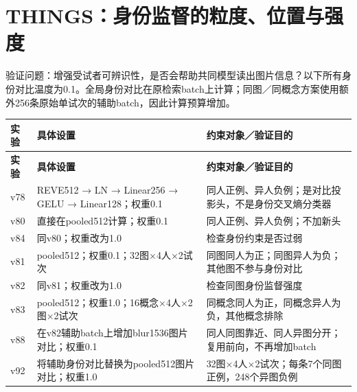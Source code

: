 \documentclass[UTF8,a4paper,11pt,fontset=none]{ctexart}
\begin{document}
\section{THINGS：身份监督的粒度、位置与强度}
验证问题：增强受试者可辨识性，是否会帮助共同模型读出图片信息？以下所有身份对比温度为0.1。全局身份对比在原检索batch上计算；同图／同概念方案使用额外256条原始单试次的辅助batch，因此计算预算增加。

{\small
\begin{longtable}{>{\raggedright\arraybackslash}p{3.311cm}>{\raggedright\arraybackslash}p{6.623cm}>{\raggedright\arraybackslash}p{6.623cm}}
\toprule
\textbf{实验} & \textbf{具体设置} & \textbf{约束对象／验证目的} \\
\midrule\endfirsthead
\textbf{实验} & \textbf{具体设置} & \textbf{约束对象／验证目的} \\
\midrule\endhead
\bottomrule\endfoot
v78 & REVE512 → LN → Linear256 → GELU → Linear128；权重0.1 & 同人正例、异人负例；是对比投影头，不是身份交叉熵分类器 \\
v80 & 直接在pooled512计算；权重0.1 & 同人正例、异人负例；不加新头 \\
v84 & 同v80；权重改为1.0 & 检查身份约束是否过弱 \\
v81 & pooled512；权重0.1；32图×4人×2试次 & 同图同人为正；同图异人为负；其他图不参与身份对比 \\
v82 & 同v81；权重改为1.0 & 检查同图身份监督强度 \\
v83 & pooled512；权重1.0；16概念×4人×2图×2试次 & 同概念同人为正，同概念异人为负，其他概念排除 \\
v88 & 在v82辅助batch上增加blur1536图片对比；权重0.1 & 同人同图靠近、同人异图分开；复用前向，不再增加batch \\
v92 & 将辅助身份对比替换为pooled512图片对比；权重1.0 & 32图×4人×2试次；每条7个同图正例，248个异图负例 \\
\end{longtable}
}
\end{document}
